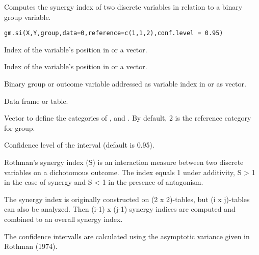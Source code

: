 \begin{Description}\relax
Computes the synergy index of two discrete variables in relation to 
a binary group variable.
\end{Description}
\begin{Usage}
\begin{verbatim}
gm.si(X,Y,group,data=0,reference=c(1,1,2),conf.level = 0.95)
\end{verbatim}
\end{Usage}
\begin{Arguments}
\begin{ldescription}
\item[\code{X}] Index of the variable's position in  or a vector. 
\item[\code{Y}] Index of the variable's position in  or a vector. 
\item[\code{group}] Binary group or outcome variable addressed as variable index in 
 or as vector.
\item[\code{data}] Data frame or table. 
\item[\code{reference}] Vector to define the  categories of ,  and .
By default, 2 is the reference category for group.
\item[\code{conf.level}] Confidence level of the interval (default is 0.95). 
\end{ldescription}
\end{Arguments}
\begin{Details}\relax
Rothman's synergy index (S) is an interaction measure between two
discrete variables on a dichotomous outcome. 
The index equals 1 under additivity, S > 1 in the case of synergy and 
S < 1 in the presence of antagonism.

The synergy index is originally constructed on (2 x 2)-tables, but (i x j)-tables can
also be analyzed. Then (i-1) x (j-1) synergy indices are computed and combined to 
an overall synergy index.    

The confidence intervalls are calculated using the asymptotic variance given in 
Rothman (1974).
\end{Details}
